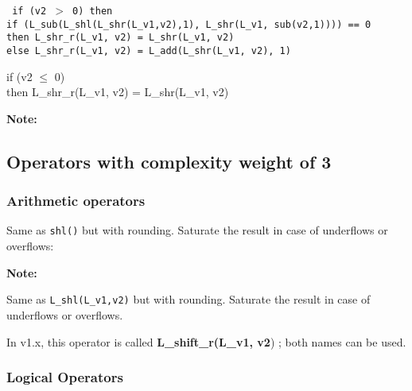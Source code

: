 {\tt
{} if (v2 $>$ 0) then\\
   if (L\_sub(L\_shl(L\_shr(L\_v1,v2),1), L\_shr(L\_v1, sub(v2,1)))) == 0 \\
   then L\_shr\_r(L\_v1, v2) = L\_shr(L\_v1, v2)\\
   else L\_shr\_r(L\_v1, v2) = L\_add(L\_shr(L\_v1, v2), 1)

 if (v2 $\leq$ 0) \\
   then L\_shr\_r(L\_v1, v2) = L\_shr(L\_v1, v2)}

\textbf{Note:} \hfill {}

\subsection{Operators with complexity weight of 3}
\subsubsection{Arithmetic operators}


Same as {\tt shl()} but with rounding. Saturate the result in case
of underflows or overflows:


\textbf{Note:} \hfill {}



Same as {\tt L\_shl(L\_v1,v2)} but with rounding. Saturate the
result in case of underflows or overflows.


In v1.x, this operator is called \textbf{L\_shift\_r(L\_v1, v2}) ;
both names can be used.

\subsubsection{Logical Operators}


